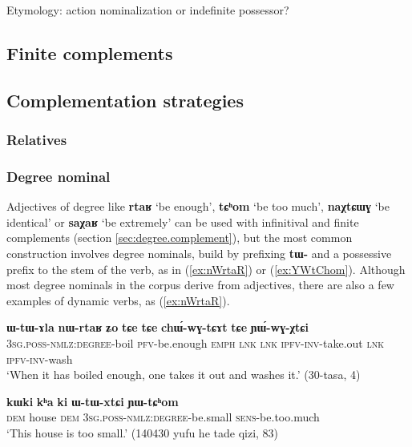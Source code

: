 \documentclass[oldfontcommands,oneside,a4paper,11pt]{article}
\newcommand{\ipa}[1]{\textbf{\phon#1}} %
\newcommand{\jpg}[2]{\ipa{#1} `#2'} %
\begin{document}
Etymology: action nominalization or indefinite possessor? 
 
 \subsection{Finite complements} 

 

 \subsection{Complementation strategies}  
 
  \subsubsection{Relatives}  
  
  \subsubsection{Degree nominal}  \label{sec:degree}
Adjectives of degree like \jpg{rtaʁ}{be enough}, \jpg{tɕʰom}{be too much}, \jpg{naχtɕɯɣ}{be identical} or \jpg{saχaʁ}{be extremely} can be used with infinitival and finite complements (section \ref{sec:degree.complement}), but the most common construction involves degree nominals, build by prefixing \ipa{tɯ-} and a possessive prefix to the stem of the verb, as in (\ref{ex:nWrtaR}) or (\ref{ex:YWtChom}). Although most degree nominals in the corpus derive from adjectives, there are also a few examples of dynamic verbs, as (\ref{ex:nWrtaR}).


\begin{exe}
\ex \label{ex:nWrtaR}
\gll \ipa{ɯ-tɯ-ɤla} 	\ipa{nɯ-rtaʁ} 	\ipa{ʑo} 	\ipa{tɕe} 	\ipa{tɕe} 	\ipa{chɯ́-wɣ-tɕɤt} 	\ipa{tɕe} 	\ipa{ɲɯ́-wɣ-χtɕi} \\
\textsc{3sg.poss-nmlz:degree}-boil \textsc{pfv}-be.enough \textsc{emph} \textsc{lnk} \textsc{lnk} \textsc{ipfv-inv}-take.out  \textsc{lnk} \textsc{ipfv-inv}-wash \\
\glt `When it has boiled enough, one takes it out and washes it.' (30-tasa, 4)
\end{exe}

\begin{exe}
\ex \label{ex:YWtChom}
\gll
\ipa{kɯki} 	\ipa{kʰa} 	\ipa{ki} 	\ipa{ɯ-tɯ-xtɕi} 	\ipa{ɲɯ-tɕʰom} \\
\textsc{dem} house \textsc{dem} \textsc{3sg.poss-nmlz:degree}-be.small \textsc{sens}-be.too.much \\
\glt `This house is too small.' (140430 yufu he tade qizi, 83)
\end{exe}
\end{document}

